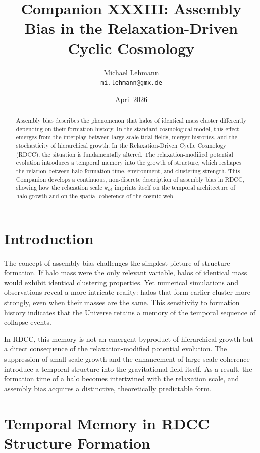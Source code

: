 \documentclass[11pt,a4paper]{article}
\title{\textbf{Companion XXXIII: Assembly Bias in the Relaxation-Driven Cyclic Cosmology}}
\author{Michael Lehmann \\ \texttt{mi.lehmann@gmx.de}}
\date{April 2026}
\begin{document}
\maketitle

\begin{abstract}
Assembly bias describes the phenomenon that halos of identical mass cluster differently 
depending on their formation history. In the standard cosmological model, this effect 
emerges from the interplay between large-scale tidal fields, merger histories, and the 
stochasticity of hierarchical growth. In the Relaxation-Driven Cyclic Cosmology (RDCC), 
the situation is fundamentally altered. The relaxation-modified potential evolution 
introduces a temporal memory into the growth of structure, which reshapes the relation 
between halo formation time, environment, and clustering strength. This Companion 
develops a continuous, non-discrete description of assembly bias in RDCC, showing how 
the relaxation scale $k_{\mathrm{rel}}$ imprints itself on the temporal architecture of 
halo growth and on the spatial coherence of the cosmic web.
\end{abstract}
\section{Introduction}

The concept of assembly bias challenges the simplest picture of structure formation. 
If halo mass were the only relevant variable, halos of identical mass would exhibit 
identical clustering properties. Yet numerical simulations and observations reveal a 
more intricate reality: halos that form earlier cluster more strongly, even when their 
masses are the same. This sensitivity to formation history indicates that the Universe 
retains a memory of the temporal sequence of collapse events.

In RDCC, this memory is not an emergent byproduct of hierarchical growth but a direct 
consequence of the relaxation-modified potential evolution. The suppression of 
small-scale growth and the enhancement of large-scale coherence introduce a temporal 
structure into the gravitational field itself. As a result, the formation time of a 
halo becomes intertwined with the relaxation scale, and assembly bias acquires a 
distinctive, theoretically predictable form.
\section{Temporal Memory in RDCC Structure Formation}
\end{document}
